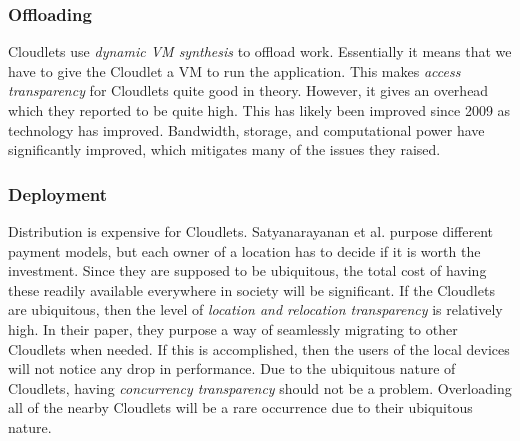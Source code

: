 \subsubsection{Offloading}
Cloudlets use \textit{dynamic VM synthesis} \cite{satyanarayanan_case_2009} to offload work. Essentially it means that we have to give the Cloudlet a VM to run the application. This makes \textit{access transparency} for Cloudlets quite good in theory. However, it gives an overhead which they reported to be quite high. This has likely been improved since 2009 as technology has improved. Bandwidth, storage, and computational power have significantly improved, which mitigates many of the issues they raised.

\subsubsection{Deployment}
Distribution is expensive for Cloudlets. Satyanarayanan et al. \cite{satyanarayanan_case_2009} purpose different payment models, but each owner of a location has to decide if it is worth the investment. Since they are supposed to be ubiquitous, the total cost of having these readily available everywhere in society will be significant. If the Cloudlets are ubiquitous, then the level of \textit{location and relocation transparency} is relatively high. In their paper, they purpose a way of seamlessly migrating to other Cloudlets when needed. If this is accomplished, then the users of the local devices will not notice any drop in performance. Due to the ubiquitous nature of Cloudlets, having \textit{concurrency transparency} should not be a problem. Overloading all of the nearby Cloudlets will be a rare occurrence due to their ubiquitous nature.